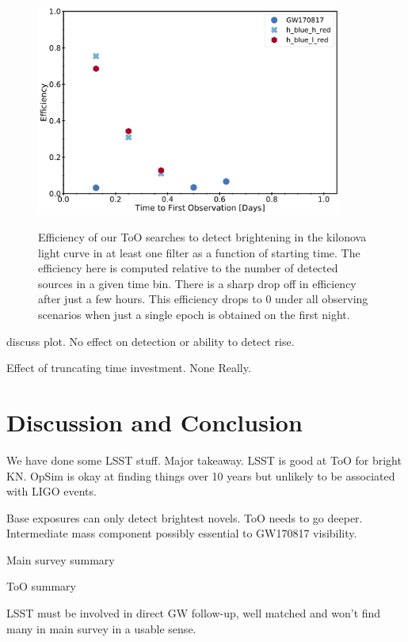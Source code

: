 \begin{figure}[!t]
\begin{center}
\hspace*{-0.1in}
\scalebox{1.}
{\includegraphics[width=0.9\textwidth]{./figs/chapter6/f6.pdf}}
\caption{\singlespace Efficiency of our ToO searches to detect brightening in the kilonova light curve in at least one filter as a function of starting time. The efficiency here is computed relative to the number of detected sources in a given time bin. There is a sharp drop off in efficiency after just a few hours. This efficiency drops to 0 under all observing scenarios when just a single epoch is obtained on the first night.}
\label{fig:ch6_dist_eff}
\end{center}
\end{figure}

discuss plot. No effect on detection or ability to detect rise. 

Effect of truncating time investment. None Really.

\section{Discussion and Conclusion}
\label{sec:ch6_conc}
We have done some LSST stuff. Major takeaway. LSST is good at ToO for bright KN. OpSim is okay at finding things over 10 years but unlikely to be associated with LIGO events.

Base exposures can only detect brightest novels. ToO needs to go deeper. Intermediate mass component possibly essential to GW170817 visibility.

Main survey summary

ToO summary

LSST must be involved in direct GW follow-up, well matched and won't find many in main survey in a usable sense.


